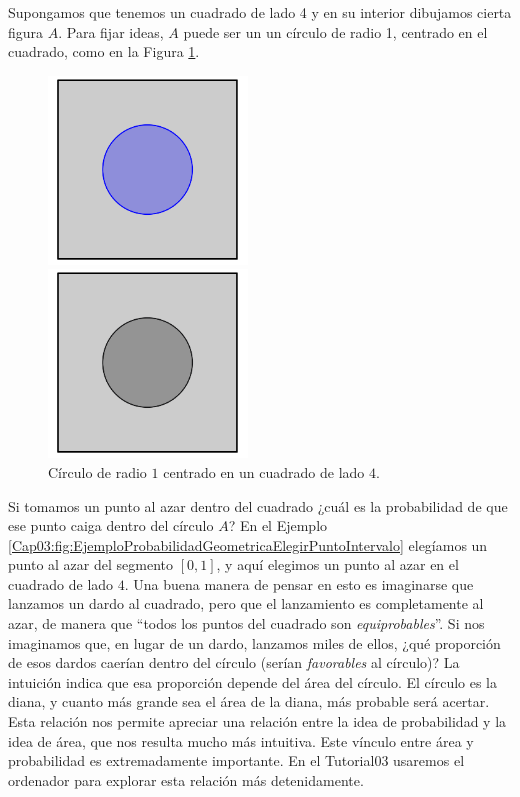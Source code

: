 \begin{Ejemplo}
\label{Cap03:ejem:ProbabilidadGeometricaMontecarlo}
Supongamos que tenemos un cuadrado de lado 4 y en su interior dibujamos cierta figura $A$. Para fijar ideas, $A$ puede ser un un círculo de radio 1, centrado en el cuadrado, como en la Figura \ref{Cap03:fig:Circulo}.
    \begin{figure}[h]
	\centering
	\begin{enColor}
	\includegraphics[height=5cm]{../fig/Cap03-Montecarlo.png}
	\end{enColor}
	\begin{bn}
	\includegraphics[height=5cm]{../fig/Cap03-Montecarlo-bn.png}
	\end{bn}
	\caption{C\'irculo de radio $1$ centrado en un cuadrado de lado $4$.}\label{Cap03:fig:Circulo}
    \end{figure}
Si tomamos un punto al azar dentro del cuadrado ¿cuál es la probabilidad de que ese punto caiga dentro del círculo $A$?  En el Ejemplo \ref{Cap03:fig:EjemploProbabilidadGeometricaElegirPuntoIntervalo} elegíamos un punto al azar del segmento $[0,1]$, y aquí elegimos un punto al azar en el cuadrado de lado $4$. Una buena manera de pensar en esto es imaginarse que lanzamos un dardo al cuadrado, pero que el lanzamiento es completamente al azar, de manera que  ``todos los puntos del cuadrado son {\em equiprobables}''. Si nos imaginamos que, en lugar de un dardo, lanzamos miles de ellos, ¿qué proporción de esos dardos caerían dentro del círculo (serían {\em favorables} al círculo)? La intuición indica que esa proporción depende del área del círculo. El círculo es la diana, y cuanto más grande sea el área de la diana, más probable será acertar. Esta relación nos permite apreciar una relación entre la idea de probabilidad y la idea de área, que nos resulta mucho más intuitiva. Este vínculo entre área y probabilidad es extremadamente importante. En el Tutorial03 usaremos el ordenador para explorar esta relación más detenidamente.


\end{Ejemplo}
